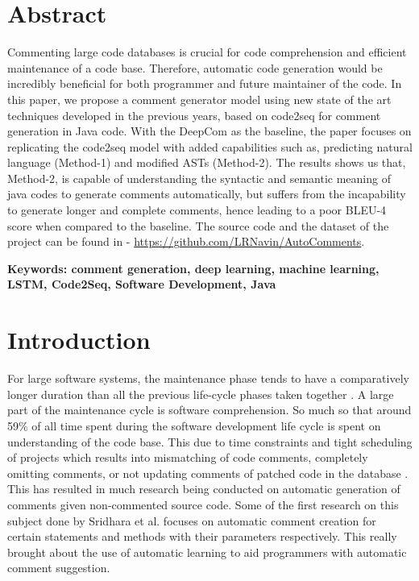 \documentclass[a4paper,10pt]{article}
\theoremstyle{plain}
\theoremstyle{definition}
\begin{document}
\begin{multicols*}{2}
{\itshape
\section*{Abstract} 
Commenting large code databases is crucial for code comprehension and efficient maintenance of a code base. Therefore, automatic code generation would be incredibly beneficial for both programmer and future maintainer of the code. In this paper, we propose a comment generator model using new state of the art techniques developed in the previous years, based on code2seq\cite{alon2018code2seq} for comment generation in Java code. With the DeepCom\cite{hu2018deep} as the baseline, the paper focuses on replicating the code2seq model with added capabilities such as, predicting natural language (Method-1) and modified ASTs (Method-2). The results shows us that, Method-2, is capable of understanding the syntactic and semantic meaning of java codes to generate comments automatically, but suffers from the incapability to generate longer and complete comments, hence leading to a poor BLEU-4 score when compared to the baseline. The source code and the dataset of the project can be found in - \url{https://github.com/LRNavin/AutoComments}.
}

\bigskip\noindent
\textbf{Keywords: comment generation, deep learning, machine learning, LSTM, Code2Seq, Software Development, Java}

\section{Introduction}
For large software systems, the maintenance phase tends to
have a comparatively longer duration than all the previous
life-cycle phases taken together \cite{aggarwal2002integrated}. A large part of the maintenance cycle is software comprehension. So much so that around 59\% of all time spent during the software development life cycle is spent on understanding of the code base. This due to time constraints and tight scheduling of projects which results into mismatching of code comments, completely omitting comments, or not updating comments of patched code in the database \cite{hu2018deep}. This has resulted in much research being conducted on automatic generation of comments given non-commented source code. Some of the first research on this subject done by Sridhara et al. \cite{sridhara2010towards} \cite{sridhara2011automatically} \cite{sridhara2011generating} focuses on automatic comment creation for certain statements and methods with their parameters respectively. 
This really brought about the use of automatic learning to aid programmers with automatic comment suggestion. 


\end{multicols*}
\end{document}
